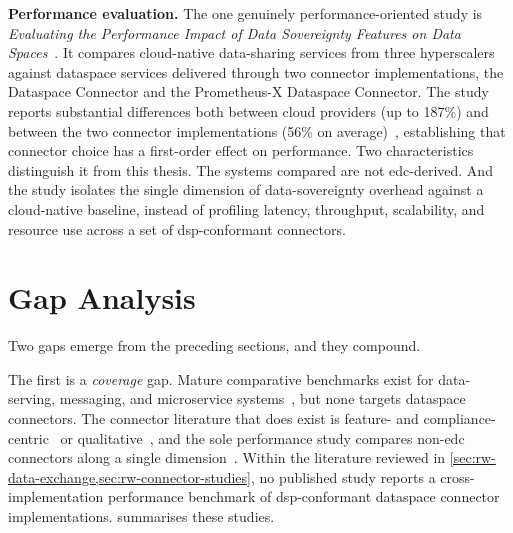 \textbf{Performance evaluation.} The one genuinely performance-oriented study is \emph{Evaluating the Performance Impact of Data Sovereignty Features on Data Spaces}~\citep{evaluatingtheperformanceimpactofdatasovereignty}. It compares cloud-native data-sharing services from three hyperscalers against dataspace services delivered through two connector implementations, the Dataspace Connector and the Prometheus-X Dataspace Connector. The study reports substantial differences both between cloud providers (up to 187\%) and between the two connector implementations (56\% on average)~\citep{evaluatingtheperformanceimpactofdatasovereignty}, establishing that connector choice has a first-order effect on performance. Two characteristics distinguish it from this thesis. The systems compared are not \gls{edc}-derived. And the study isolates the single dimension of data-sovereignty overhead against a cloud-native baseline, instead of profiling latency, throughput, scalability, and resource use across a set of \gls{dsp}-conformant connectors.


\section{Gap Analysis}\label{sec:gap-analysis}

Two gaps emerge from the preceding sections, and they compound.

The first is a \emph{coverage} gap. Mature comparative benchmarks exist for data-serving, messaging, and microservice systems~\citep{cooper2010ycsb, dizdarevic2023mqttbrokers, gan2019deathstarbench}, but none targets dataspace connectors. The connector literature that does exist is feature- and compliance-centric~\citep{dam2024surveydataspaceconnectorimplementations, idsaConnectorReport2025} or qualitative~\citep{pampus2022evolving, arnold2025servicearchitecture}, and the sole performance study compares non-\gls{edc} connectors along a single dimension~\citep{evaluatingtheperformanceimpactofdatasovereignty}. Within the literature reviewed in \cref{sec:rw-data-exchange,sec:rw-connector-studies}, no published study reports a cross-implementation performance benchmark of \gls{dsp}-conformant dataspace connector implementations.  summarises these studies.

